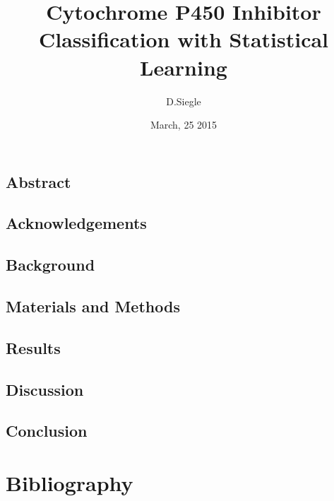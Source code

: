\documentclass[12pt]{report}
\author{D.Siegle}
\title{Cytochrome P450 Inhibitor Classification with Statistical Learning}
\date{March, 25 2015}
\begin{document}


\chapter*{Abstract}


\tableofcontents
{}
\listoftables
{}
\listoffigures

\begin{doublespacing}

\chapter*{Acknowledgements}


\chapter{Background}



\chapter{Materials and Methods}


\chapter{Results}
\thispagestyle{empty}




\chapter{Discussion}


\chapter{Conclusion}


\end{doublespacing}

\part*{Bibliography}

{}

\end{document}
